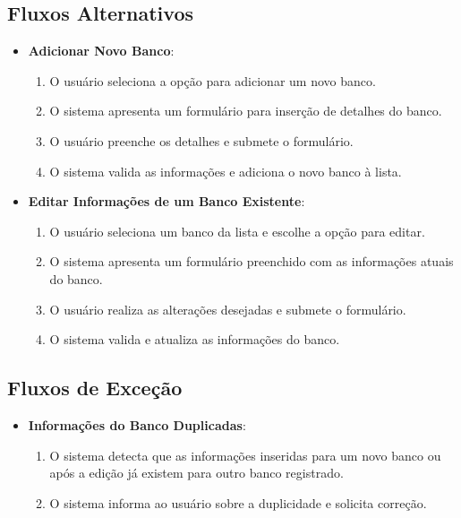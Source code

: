 \subsection*{Fluxos Alternativos}
\begin{addmargin}[1.5cm]{0cm}
    \begin{itemize}
        \item \textbf{Adicionar Novo Banco}:
        \begin{enumerate}
            \item O usuário seleciona a opção para adicionar um novo banco.
            \item O sistema apresenta um formulário para inserção de detalhes do banco.
            \item O usuário preenche os detalhes e submete o formulário.
            \item O sistema valida as informações e adiciona o novo banco à lista.
        \end{enumerate}
    
        \item \textbf{Editar Informações de um Banco Existente}:
        \begin{enumerate}
            \item O usuário seleciona um banco da lista e escolhe a opção para editar.
            \item O sistema apresenta um formulário preenchido com as informações atuais do banco.
            \item O usuário realiza as alterações desejadas e submete o formulário.
            \item O sistema valida e atualiza as informações do banco.
        \end{enumerate}
    \end{itemize}
\end{addmargin}

\subsection*{Fluxos de Exceção}
\begin{addmargin}[1.5cm]{0cm}
    \begin{itemize}
        \item \textbf{Informações do Banco Duplicadas}:
        \begin{enumerate}
            \item O sistema detecta que as informações inseridas para um novo banco ou após a edição já existem para outro banco registrado.
            \item O sistema informa ao usuário sobre a duplicidade e solicita correção.
        \end{enumerate}
    \end{itemize}
\end{addmargin}

